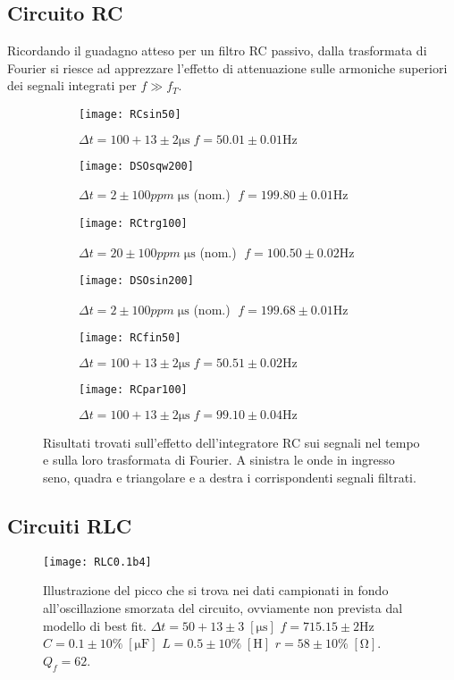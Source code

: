 \documentclass{article}[a4paper, oneside, 11pt]
\begin{document}
\subsection{Circuito RC}
Ricordando il guadagno atteso per un filtro RC passivo, dalla trasformata
di Fourier si riesce ad apprezzare l'effetto di attenuazione sulle armoniche
superiori dei segnali integrati per $f \gg f_T$.
\begin{figure}[!htb]
\centering
	\begin{subfigure}{.5\textwidth}
	\texttt{[image: RCsin50]}
	\caption{$\Delta t = 100 + 13 \pm 2 \si{\micro\s} \; f = 50.01 \pm 0.01 \si{\Hz}$}
	\texttt{[image: DSOsqw200]}
	\caption{$\Delta t = 2 \pm 100 \si{ppm} \; \si{\micro\s}$ (nom.)
	$\; f = 199.80 \pm 0.01 \si{\Hz}$}
	\texttt{[image: RCtrg100]}
	\caption{$\Delta t = 20 \pm 100 \si{ppm} \; \si{\micro\s}$ (nom.)
	$ \; f = 100.50 \pm 0.02 \si{\Hz}$}
\label{fig: RCin}
	\end{subfigure}%
	\begin{subfigure}{.5\textwidth}
	\texttt{[image: DSOsin200]}
	\caption{$\Delta t = 2 \pm 100 \si{ppm} \; \si{\micro\s}$ (nom.)
	$\; f = 199.68 \pm 0.01 \si{\Hz}$}
	\texttt{[image: RCfin50]}
	\caption{$\Delta t = 100 + 13 \pm 2 \si{\micro\s} \; f = 50.51 \pm 0.02 \si{\Hz}$}
	\texttt{[image: RCpar100]}
	\caption{$\Delta t = 100 + 13 \pm 2 \si{\micro\s} \; f = 99.10 \pm 0.04 \si{\Hz}$}
\label{fig: Rcint}
	\end{subfigure}%
	\caption{Risultati trovati sull'effetto dell'integratore RC sui segnali
			nel tempo e sulla loro trasformata di Fourier. A sinistra le
			onde in ingresso seno, quadra e triangolare e a destra i corrispondenti 
		 	segnali filtrati. \label{fig: RCall}}
\end{figure}

\subsection{Circuiti RLC}
\begin{figure}[!htb]
\centering
	\texttt{[image: RLC0.1b4]}
	\caption{Illustrazione del picco che si trova nei dati campionati
			in fondo all'oscillazione smorzata del circuito, ovviamente
			non prevista dal modello di best fit. 
			$\Delta t = 50 + 13 \pm 3 \; [\si{\micro\s}]$ $f = 715.15 \pm 2 \si{\Hz}$
			$C = 0.1 \pm 10\% \; [\si{\micro\F}]$ $L = 0.5 \pm 10 \% \;
			[\si{\henry}]$ $r = 58 \pm 10\%	\; [\si{\ohm}]$.
			$Q_f = 62$.	\label{fig: RLC0.1b5}}
\end{figure}
\end{document}
